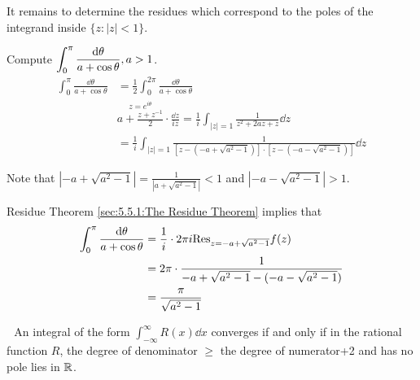     It remains to determine the residues which correspond to the poles of the integrand inside  $ \{z:|z|<1\} $.
    \begin{example}
        Compute  $ \displaystyle\int_0^\pi\frac{\mathrm{d} \theta }{a+\cos\theta},a>1 $. 
        \begin{equation*}
            \begin{aligned}
                \int_0^\pi \frac{\dd \theta}{a+\cos\theta   }&=\frac{1 }{2}\int_0^{2\pi }\frac{\dd \theta}{a+\cos\theta}\\
                &\overset{z=e^{i\theta }}{a+\frac{z+z^{-1}}{2}}\cdot\frac{\dd z }{iz}=\frac{1 }{i }\int_{|z|=1}\frac{1 }{z^2+2az+z}\dd z\\
                &=\frac{1 }{i }\int_{|z|=1}\frac{1}{\left[z-(-a+\sqrt{a^2-1})\right]\cdot\left[z-(-a-\sqrt{a^2-1})\right]}\dd z
            \end{aligned}
        \end{equation*}
        
        Note that  $ |-a+\sqrt{a^2-1}|=\frac{1 }{|a+\sqrt{a^2-1}|}<1 $ and  $ |-a-\sqrt{a^2-1}|>1 $.

        Residue Theorem \ref{sec:5.5.1:The Residue Theorem} implies that 
        \begin{align*}
            \int_0^\pi \frac{\mathrm{d} \theta }{a+\cos\theta}&=\frac{1 }{i }\cdot 2\pi i\mathrm{Res}_{z=-a+\sqrt{a^2-1}}f(z)\\
            &=2\pi \cdot \frac{1}{-a+\sqrt{a^2-1}-(-a-\sqrt{a^2-1})}\\
            &=\frac{\pi    }{\sqrt{a^2-1}}
        \end{align*}
    \end{example} 
    \noindent{}\,\,\,\,An integral of the form  $ \int_{-\infty}^\infty R(x)\dd x $ converges if and only if in the rational function  $ R $, the degree of denominator  $ \geq $  the degree of numerator+2 and has no pole lies in  $ \mathbb R $.
    
\begin{figure}[!h]
    \centering
\end{figure}

